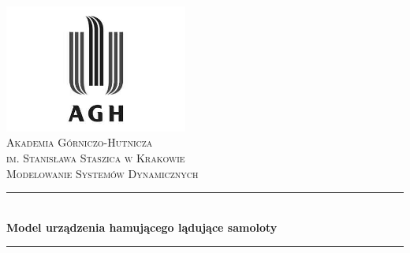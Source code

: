 \begin{titlepage}

\newcommand{\HRule}{\rule{\linewidth}{0.5mm}}

\center
 

\includegraphics[width=6cm]{../res/img/logo.png}\\[1cm]
 
 

\textsc{\LARGE Akademia Górniczo-Hutnicza \\[0.2cm]
im. Stanisława Staszica w Krakowie}\\[1.5cm]

\textsc{\Large Modelowanie Systemów Dynamicznych}\\[0.5cm]


\HRule \\[0.4cm]
{ \huge \bfseries Model urządzenia hamującego lądujące samoloty}\\%
\HRule \\[1.5cm] 
  


\end{titlepage}
